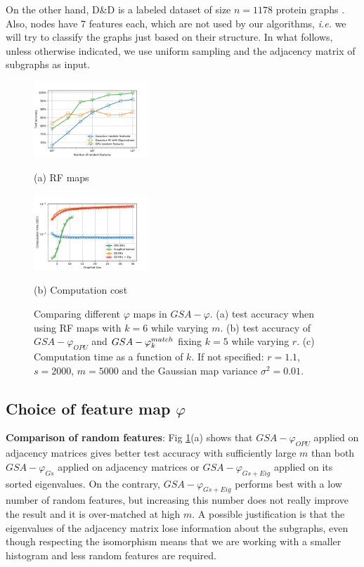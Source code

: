 \documentclass{article}
\begin{document}
On the other hand, D\&D is a labeled dataset of size $n=1178$ protein graphs \cite{DD_ref}. Also, nodes have 7 features each, which are not used by our algorithms, \emph{i.e.} we will try to classify the graphs just based on their structure. In what follows, unless otherwise indicated, we use uniform sampling and the adjacency matrix of subgraphs as input.

\begin{figure}[h]
%
\begin{minipage}[b]{.48\linewidth}
  \centering
  \centerline{\includegraphics[width=4.3cm]{figs/phi_comparison.pdf}}
  \centerline{(a) RF maps}\medskip
  \label{subfig:RF_maps}
\end{minipage}
\hfill
\begin{minipage}[b]{0.48\linewidth}
  \centering
  \centerline{\includegraphics[width=4.3cm]{figs/computational_comp.pdf}}
  \centerline{(b) Computation cost}\medskip
\end{minipage}
%
\caption{Comparing different $\varphi$ maps in $GSA-\varphi$. (a) test accuracy when using RF maps with $k=6$ while varying $m$. (b) test accuracy of $GSA-\varphi_{OPU}$ and $GSA-\varphi^{match}_k$  fixing $k=5$ while varying $r$. (c) Computation time as a function of $k$. If not specified:  $r=1.1$, $s=2000$, $m=5000$ and the Gaussian map variance $\sigma^2=0.01$.}
\label{fig:diff_phi}
%
\end{figure}

\subsection{Choice of feature map $\varphi$}
\textbf{Comparison of random features}: Fig \ref{fig:diff_phi}(a) shows  that $GSA-\varphi_{OPU}$ applied on adjacency matrices gives better test accuracy with sufficiently large $m$ than both $GSA-\varphi_{Gs}$ applied on adjacency matrices or $GSA-\varphi_{Gs+Eig}$ applied on its sorted eigenvalues. On the contrary, $GSA-\varphi_{Gs+Eig}$ performs best with a low number of random features, but increasing this number does not really improve the result and it is over-matched at high $m$. A possible justification is that the eigenvalues of the adjacency matrix lose information about the subgraphs, even though respecting the isomorphism means that we are working with a smaller histogram and less random features are required.
\end{document}
